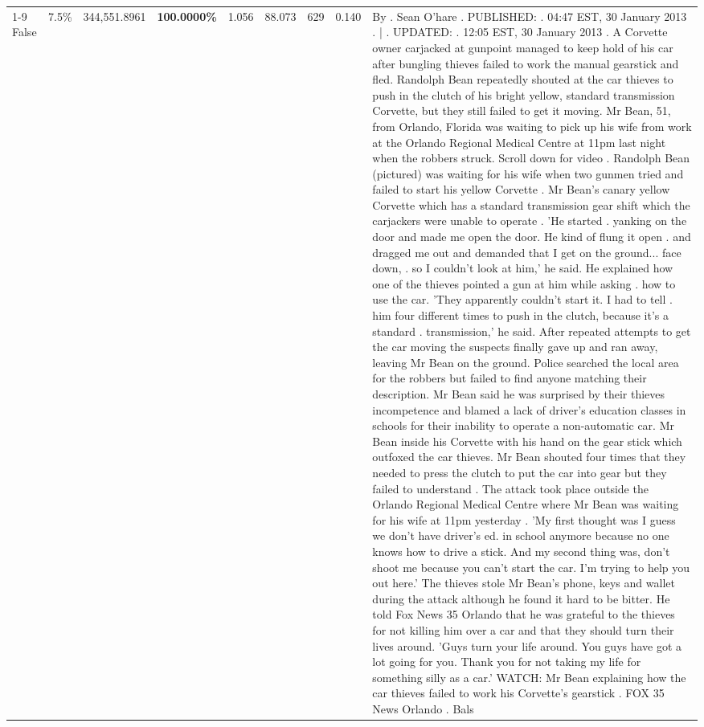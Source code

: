 \begin{table}[H]
\begin{tabular}{lllrlllll}
\cline{1-9} \cline{2-9}
False & 7.5\% & 344,551.8961 & \bfseries \color{red} 100.0000\% & 1.056 & 88.073 & 629 & 0.140 & By . Sean O'hare . PUBLISHED: . 04:47 EST, 30 January 2013 . | . UPDATED: . 12:05 EST, 30 January 2013 . A Corvette owner carjacked at gunpoint managed to keep hold of his car after bungling thieves failed to work the manual gearstick and fled. Randolph Bean repeatedly shouted at the car thieves to push in the clutch of his bright yellow, standard transmission Corvette, but they still failed to get it moving. Mr Bean, 51, from Orlando, Florida was waiting to pick up his wife from work at the Orlando Regional Medical Centre at 11pm last night when the robbers struck. Scroll down for video . Randolph Bean (pictured) was waiting for his wife when two gunmen tried and failed to start his yellow Corvette . Mr Bean's canary yellow Corvette which has a standard transmission gear shift which the carjackers were unable to operate . 'He started . yanking on the door and made me open the door. He kind of flung it open . and dragged me out and demanded that I get on the ground... face down, . so I couldn't look at him,' he said. He explained how one of the thieves pointed a gun at him while asking . how to use the car. 'They apparently couldn't start it. I had to tell . him four different times to push in the clutch, because it's a standard . transmission,' he said. After repeated attempts to get the car moving the suspects finally gave up and ran away, leaving Mr Bean on the ground. Police searched the local area for the robbers but failed to find anyone matching their description. Mr Bean said he was surprised by their thieves incompetence and blamed a lack of driver's education classes in schools for their inability to operate a non-automatic car. Mr Bean inside his Corvette with his hand on the gear stick which outfoxed the car thieves. Mr Bean shouted four times that they needed to press the clutch to put the car into gear but they failed to understand . The attack took place outside the Orlando Regional Medical Centre where Mr Bean was waiting for his wife at 11pm yesterday . 'My first thought was I guess we don't have driver's ed. in school anymore because no one knows how to drive a stick. And my second thing was, don't shoot me because you can't start the car. I'm trying to help you out here.' The thieves stole Mr Bean's phone, keys and wallet during the attack although he found it hard to be bitter. He told Fox News 35 Orlando that he was grateful to the thieves for not killing him over a car and that they should turn their lives around. 'Guys turn your life around. You guys have got a lot going for you. Thank you for not taking my life for something silly as a car.' WATCH: Mr Bean explaining how the car thieves failed to work his Corvette's gearstick . FOX 35 News Orlando . Bals \\

\end{tabular}
\end{table}
